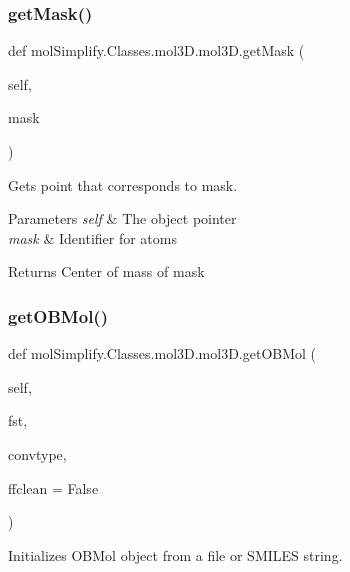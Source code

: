 \subsubsection{\texorpdfstring{get\+Mask()}{getMask()}}
{\footnotesize\ttfamily def mol\+Simplify.\+Classes.\+mol3\+D.\+mol3\+D.\+get\+Mask (\begin{DoxyParamCaption}\item[{}]{self,  }\item[{}]{mask }\end{DoxyParamCaption})}



Gets point that corresponds to mask. 


\begin{DoxyParams}{Parameters}
{\em self} & The object pointer \\
\hline
{\em mask} & Identifier for atoms \\
\hline
\end{DoxyParams}
\begin{DoxyReturn}{Returns}
Center of mass of mask 
\end{DoxyReturn}
\mbox{\label{classmolSimplify_1_1Classes_1_1mol3D_1_1mol3D_a4a723fdb1daadc53a524243198fb15cb}} 
\subsubsection{\texorpdfstring{get\+O\+B\+Mol()}{getOBMol()}}
{\footnotesize\ttfamily def mol\+Simplify.\+Classes.\+mol3\+D.\+mol3\+D.\+get\+O\+B\+Mol (\begin{DoxyParamCaption}\item[{}]{self,  }\item[{}]{fst,  }\item[{}]{convtype,  }\item[{}]{ffclean = {\ttfamily False} }\end{DoxyParamCaption})}



Initializes O\+B\+Mol object from a file or S\+M\+I\+L\+ES string. 

